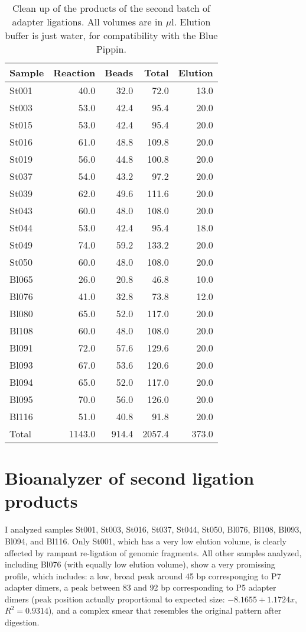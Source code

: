 \documentclass[a4paper,12pt,twosided]{article}
\begin{document}
\begin{table}
\begin{center}
\caption{Clean up of the products of the second batch of adapter ligations. All volumes are in $\mu$l. Elution buffer is just water, for compatibility with the Blue Pippin.}
\vspace*{0.2cm}
\begin{tabular}{lrrrr}
\toprule
Sample&Reaction&Beads&Total&Elution\\
\midrule
St001&40.0&32.0&72.0&13.0\\
St003&53.0&42.4&95.4&20.0\\
St015&53.0&42.4&95.4&20.0\\
St016&61.0&48.8&109.8&20.0\\
St019&56.0&44.8&100.8&20.0\\
St037&54.0&43.2&97.2&20.0\\
St039&62.0&49.6&111.6&20.0\\
St043&60.0&48.0&108.0&20.0\\
St044&53.0&42.4&95.4&18.0\\
St049&74.0&59.2&133.2&20.0\\
St050&60.0&48.0&108.0&20.0\\
Bl065&26.0&20.8&46.8&10.0\\
Bl076&41.0&32.8&73.8&12.0\\
Bl080&65.0&52.0&117.0&20.0\\
Bl108&60.0&48.0&108.0&20.0\\
Bl091&72.0&57.6&129.6&20.0\\
Bl093&67.0&53.6&120.6&20.0\\
Bl094&65.0&52.0&117.0&20.0\\
Bl095&70.0&56.0&126.0&20.0\\
Bl116&51.0&40.8&91.8&20.0\\
\midrule
Total&1143.0&914.4&2057.4&373.0\\
\bottomrule
\end{tabular}
\end{center}
\end{table}

\section{Bioanalyzer of second ligation products}
I analyzed samples St001, St003, St016, St037, St044, St050, Bl076, Bl108, Bl093, Bl094, and Bl116. Only St001, which has a very low elution volume, is clearly affected by rampant re-ligation of genomic fragments. All other samples analyzed, including Bl076 (with equally low elution volume), show a very promissing profile, which includes: a low, broad peak around 45 bp corresponging to P7 adapter dimers, a peak between 83 and 92 bp corresponding to P5 adapter dimers (peak position actually proportional to expected size: $-8.1655 + 1.1724x$, $R^2=0.9314$), and a complex smear that resembles the original pattern after digestion.
\end{document}
